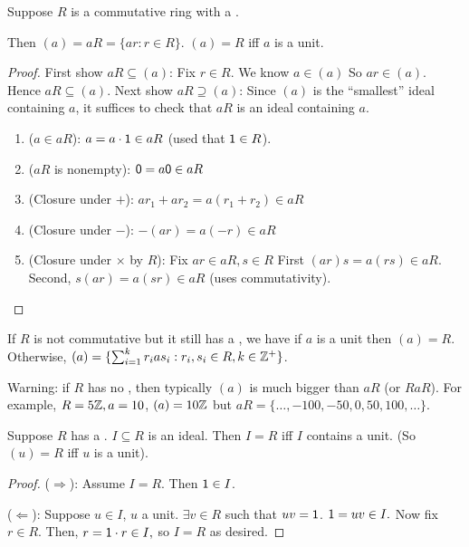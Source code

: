 \documentclass[notes.tex]{subfiles}
\begin{document}
\begin{proposition}
	Suppose $R$ is a commutative ring with a \one.

	Then $(a) = aR = \{ar : r\in R\}$. $(a) = R$ iff $a$ is a unit.
\end{proposition}
\begin{proof}
	\tabin
		First show $aR \subseteq (a)$:
	\tabout
	Fix $r\in R$. We know $a\in (a)$ So $ar\in (a)$. Hence $aR \subseteq (a)$.
	\tabin
		Next show $aR\supseteq (a)$:
	\tabout
	Since $(a)$ is the ``smallest'' ideal containing $a$, it suffices to check that $aR$ is an ideal containing $a$.
	\begin{enumerate}
		\item ($a\in aR$): $a=a\cdot \mathsf{1} \in aR$ (used that $\mathsf{1} \in R$).
		\item ($aR$ is nonempty): $\mathsf{0} = a\mathsf{0} \in aR$
		\item (Closure under $+$): $ar_1 + ar_2 = a(r_1 + r_2) \in aR$
		\item (Closure under $-$): $-(ar) = a(-r) \in aR$
		\item (Closure under $\times$ by $R$): Fix $ar\in aR, s\in R$
		First $(ar)s = a(rs) \in aR$. Second, $s(ar) = a(sr) \in aR$ (uses commutativity).
	\end{enumerate}
\end{proof}
\begin{remark}
	If $R$ is not commutative but it still has a \one, we have if $a$ is a unit then $(a) = R$. Otherwise, $(a) = \{\sum_{i=1}^kr_ias_i : r_i, s_i\in R, k\in \mathbb{Z}^+\}$.
\end{remark}
\begin{remark}
	Warning: if $R$ has no \one, then typically $(a)$ is much bigger than $aR$ (or $RaR$).
	For example, $R = 5\mathbb{Z}, a=10$, $(a) = 10\mathbb{Z}$ but $aR = \{\ldots, -100, -50, 0, 50, 100, \ldots\}$.
\end{remark}

\begin{proposition}
	\label{prop:unitideal}
	Suppose $R$ has a \one. $I\subseteq R$ is an ideal. Then $I=R$ iff $I$ contains a unit.
	(So $(u) = R$ iff $u$ is a unit).
\end{proposition}
\begin{proof}
($\Longrightarrow$): Assume $I=R$. Then $\mathsf{1} \in I$.

($\Longleftarrow$): Suppose $u\in I$, $u$ a unit. $\exists v\in R$ such that $uv =\mathsf{1}$. $\mathsf{1} = uv \in I.$ Now fix $r\in R$. Then, $r = \mathsf{1}\cdot r\in I,$ so $I=R$ as desired.
\end{proof}
\end{document}
